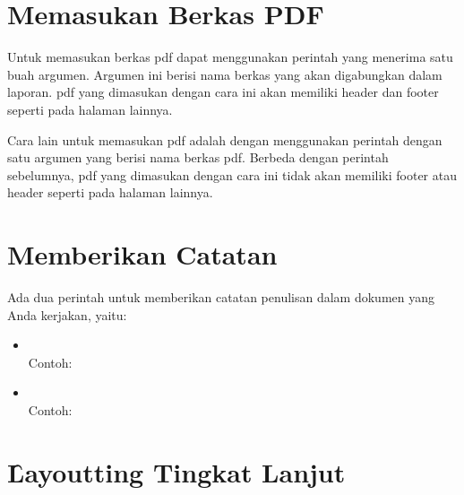 \section{Memasukan Berkas PDF}
\label{sec:pdf}
Untuk memasukan berkas \acrfull{pdf} dapat menggunakan perintah  yang menerima satu buah argumen.
Argumen ini berisi nama berkas yang akan digabungkan dalam laporan.
\acrshort{pdf} yang dimasukan dengan cara ini akan memiliki header dan footer seperti pada halaman lainnya.


Cara lain untuk memasukan \acrshort{pdf} adalah dengan menggunakan perintah  dengan satu argumen yang berisi nama berkas pdf.
Berbeda dengan perintah sebelumnya, \acrshort{pdf} yang dimasukan dengan cara ini tidak akan memiliki footer atau header seperti pada halaman lainnya.



\section{Memberikan Catatan}
\label{sec:note}
Ada dua perintah untuk memberikan catatan penulisan dalam dokumen yang Anda kerjakan, yaitu:
\begin{itemize}
	\item {} \\
	Contoh: \\
	\noindent\hspace{-1em}
	\item {} \\
	Contoh: \todoCite
\end{itemize}


\section{\f{Layoutting} Tingkat Lanjut}
\label{sec:advancedLayoutting}

